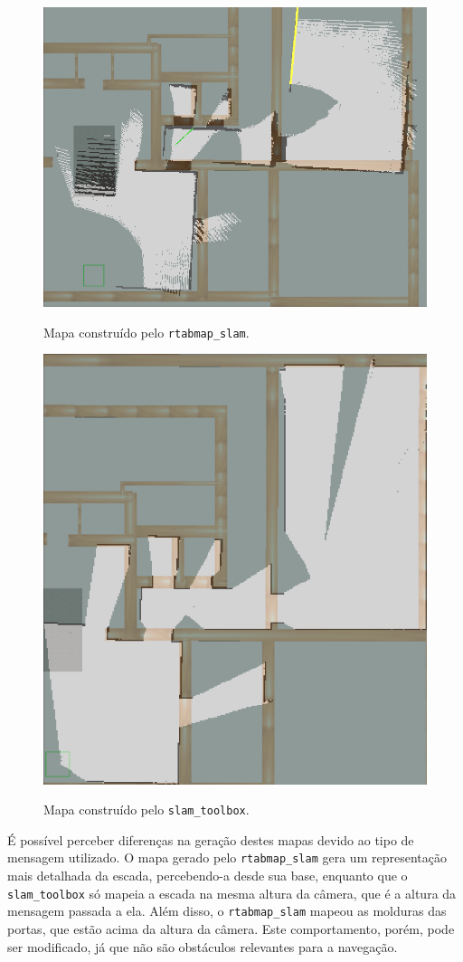 \documentclass[repeatfields,xlists,xpacks,oneside,yearsonly]{ufrgscca}
\begin{document}
\begin{figure}[h]
    {
        \centering
        \caption{Mapa construído pelo \texttt{rtabmap\_slam}.}
        \label{fig:mapping_rtabmap}
        \includegraphics[width=0.7\linewidth]{rtabmap_slam_map-compared.png}\\
    }
\end{figure}

\begin{figure}[h]
    {
        \centering
        \caption{Mapa construído pelo \texttt{slam\_toolbox}.}
        \label{fig:mapping_slam_toolbox}
        \includegraphics[width=0.6\linewidth]{slam_toolbox_map-compared.png}\\
    }
\end{figure}

É possível perceber diferenças na geração destes mapas devido ao tipo de mensagem
utilizado. O mapa gerado pelo \texttt{rtabmap\_slam} gera um representação mais
detalhada da escada, percebendo-a desde sua base, enquanto que o \texttt{slam\_toolbox}
só mapeia a escada na mesma altura da câmera, que é a altura da mensagem passada
a ela.
Além disso, o \texttt{rtabmap\_slam} mapeou as molduras das portas, que estão acima
da altura da câmera. Este comportamento, porém, pode ser modificado, já que
não são obstáculos relevantes para a navegação.
\end{document}

